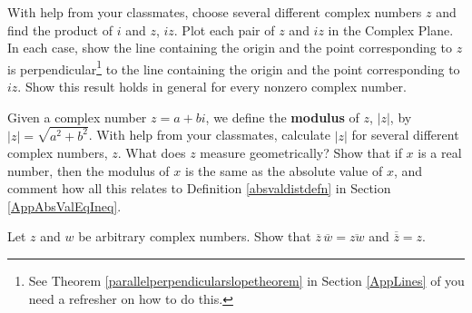 \documentclass{ximera}
\begin{document}
\begin{problem}
With help from your classmates, choose several different complex numbers $z$ and find the product of $i$ and $z$,  $iz$.  Plot each pair of $z$ and $iz$ in the Complex Plane.  In each case, show the line containing the origin and the point corresponding to $z$ is perpendicular\footnote{See Theorem \ref{parallelperpendicularslopetheorem} in Section \ref{AppLines} of you need a refresher on how to do this.} to the line containing the origin and the point corresponding to $iz$.  Show this result holds in general for every nonzero complex number.
\end{problem}

\begin{problem}\label{cmpgeoalgexlast}
Given a complex number $z = a+bi$, we define the \textbf{modulus} of $z$, $|z|$, by $|z| = \sqrt{a^2+b^2}$.  With help from your classmates, calculate $|z|$ for several different complex numbers, $z$.  What does $z$ measure geometrically?  Show that if $x$ is a real number, then the modulus of $x$ is the same as the absolute value of $x$, and comment how all this relates to Definition \ref{absvaldistdefn} in Section \ref{AppAbsValEqIneq}.
\end{problem}

\begin{problem}\label{zbarexercise}
Let $z$ and $w$ be arbitrary complex numbers.  Show that  $\overline{z} \, \overline{w}  = \overline{zw}$ and $\overline{\overline{z}} = z$.  
\end{problem}  
\end{document}
